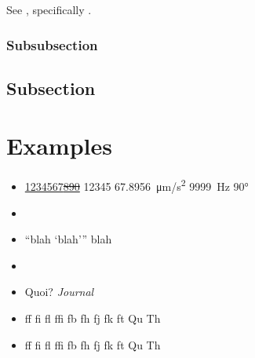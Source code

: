 \documentclass[a4paper, 11pt]{lt_article}
\begin{document}
\blindtext
See , specifically .

\subsubsection{Subsubsection}
\Blindtext[1]

\subsection{Subsection} %

\Blindtext[2]



\newrefcontext[sorting=nyt]
\printbibliography

\newpage
\section{Examples} %
\label{sec:Examples}

\textrm{\blindtext}

\textit{\blindtext}

\textbf{\blindtext}

\textsc{\blindtext}

\newpage

\textsf{\blindtext}

\textsf{\textit{\blindtext}}

\textsf{\textbf{\blindtext}}

\texttt{\blindtext}

\newpage

\begin{itemize}

    \item \uline{1234567\sout{890}} \num{12345} \SI{67.8956}{\um/\s^2}
        \SI{9999}{\hertz} \ang{90}

    \item \LuaTeX\ \LuaLaTeX

    \item \enquote{blah \enquote{blah}} blah

    \item \eg \ie \cf \etc

    \item Quoi? \textit{Journal}

    \item ff fi fl ffi fb fh fj fk ft Qu Th

    \item \textsf{ff fi fl ffi fb fh fj fk ft Qu Th}

\end{itemize}

\end{document}
